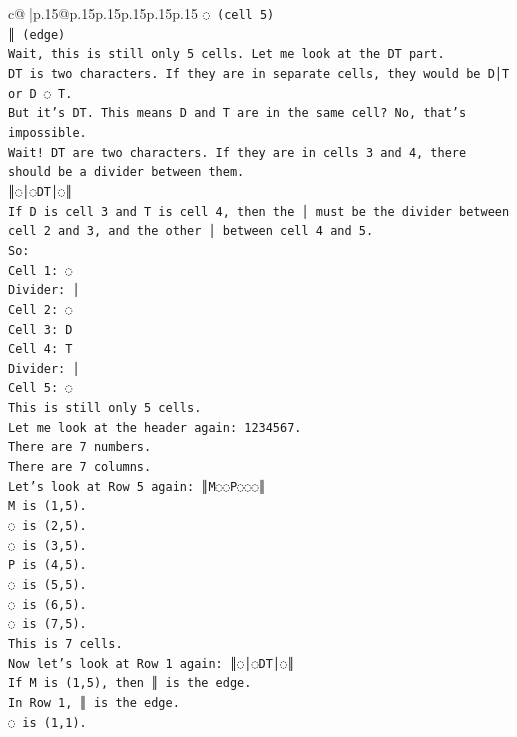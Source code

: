 \documentclass{article}
\begin{document}
{\begin{supertabular}{c@{$\;$}|p{.15\linewidth}@{}p{.15\linewidth}p{.15\linewidth}p{.15\linewidth}p{.15\linewidth}p{.15\linewidth}}
{{{\texttt{◌ (cell 5)} \\
\texttt{║ (edge)} \\
\texttt{Wait, this is still only 5 cells. Let me look at the DT part.} \\
\texttt{DT is two characters. If they are in separate cells, they would be D│T or D ◌ T.} \\
\texttt{But it's DT. This means D and T are in the same cell? No, that's impossible.} \\
\texttt{Wait! DT are two characters. If they are in cells 3 and 4, there should be a divider between them.} \\
\texttt{║◌│◌DT│◌║} \\
\texttt{If D is cell 3 and T is cell 4, then the │ must be the divider between cell 2 and 3, and the other │ between cell 4 and 5.} \\
\texttt{So:} \\
\texttt{Cell 1: ◌} \\
\texttt{Divider: │} \\
\texttt{Cell 2: ◌} \\
\texttt{Cell 3: D} \\
\texttt{Cell 4: T} \\
\texttt{Divider: │} \\
\texttt{Cell 5: ◌} \\
\texttt{This is still only 5 cells.} \\
\texttt{Let me look at the header again: 1234567.} \\
\texttt{There are 7 numbers.} \\
\texttt{There are 7 columns.} \\
\texttt{Let's look at Row 5 again: ║M◌◌P◌◌◌║} \\
\texttt{M is (1,5).} \\
\texttt{◌ is (2,5).} \\
\texttt{◌ is (3,5).} \\
\texttt{P is (4,5).} \\
\texttt{◌ is (5,5).} \\
\texttt{◌ is (6,5).} \\
\texttt{◌ is (7,5).} \\
\texttt{This is 7 cells.} \\
\texttt{Now let's look at Row 1 again: ║◌│◌DT│◌║} \\
\texttt{If M is (1,5), then ║ is the edge.} \\
\texttt{In Row 1, ║ is the edge.} \\
\texttt{◌ is (1,1).} \\
}}}
\end{supertabular}}
\end{document}
